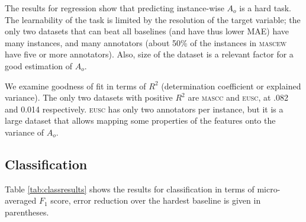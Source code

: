 \documentclass[11pt,a4paper]{article}
\begin{document}
The results for regression show that predicting instance-wise $A_o$ is a hard task. The learnability of the task is limited by the resolution of the target variable; the only two datasets that can beat all baselines (and have thus lower MAE) have many instances, and many annotators (about 50\% of the instances in \textsc{mascew} have five or more annotators). Also, size of the dataset is a relevant factor for a good estimation of $A_o$.

We examine goodness of fit in terms of $R^2$ (determination coefficient or explained variance). The only two datasets with positive $R^2$ are \textsc{mascc} and \textsc{eusc}, at .082 and 0.014 respectively. \textsc{eusc} has only two annotators per instance, but it is a large dataset that allows mapping some properties of the features onto the variance of $A_o$.







\subsection{Classification}
\label{sec:class}

Table \ref{tab:classresults} shows the results for classification in terms of micro-averaged $F_1$ score, error reduction over the hardest baseline is given in parentheses.
\end{document}
